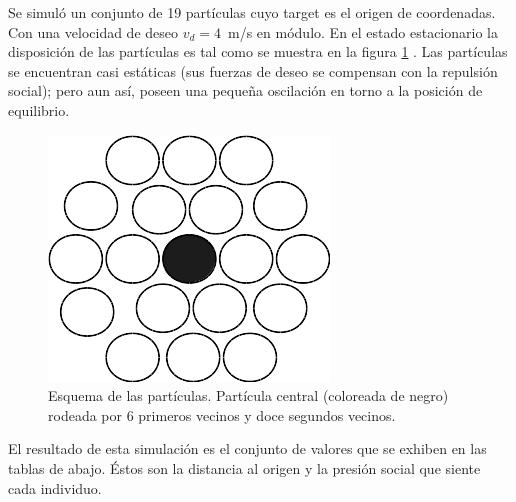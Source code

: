 Se simuló un conjunto de 19 partículas cuyo target es el origen de coordenadas. Con una velocidad de deseo $v_d=4$~m/s en módulo. En el estado estacionario la disposición de las partículas es tal como se muestra en la figura \ref{central} . Las partículas se encuentran casi estáticas (sus fuerzas de deseo se compensan con la repulsión social); pero aun así, poseen una pequeña oscilación en torno a la posición de equilibrio. 

\begin{figure}[H]
    \centering
        \includegraphics[scale=0.5]{figuras/central.png}
    \caption[width=5cm]{Esquema de las partículas. Partícula central (coloreada de negro) rodeada por 6 primeros vecinos y doce segundos vecinos.}
    \label{central}
\end{figure}


El resultado de esta simulación es el conjunto de valores que se exhiben en las tablas de abajo. Éstos son la distancia al origen y la presión social que siente cada individuo. 

